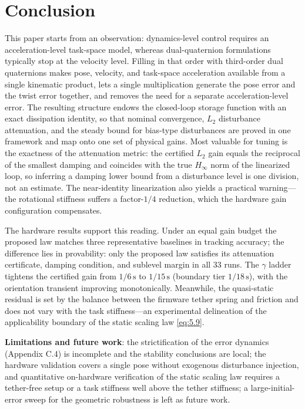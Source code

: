 \section{Conclusion}

This paper starts from an observation: dynamics-level control requires an acceleration-level task-space model, whereas dual-quaternion formulations typically stop at the velocity level. Filling in that order with third-order dual quaternions makes pose, velocity, and task-space acceleration available from a single kinematic product, lets a single multiplication generate the pose error and the twist error together, and removes the need for a separate acceleration-level error. The resulting structure endows the closed-loop storage function with an exact dissipation identity, so that nominal convergence, $L_2$ disturbance attenuation, and the steady bound for bias-type disturbances are proved in one framework and map onto one set of physical gains. Most valuable for tuning is the exactness of the attenuation metric: the certified $L_2$ gain equals the reciprocal of the smallest damping and coincides with the true $H_\infty$ norm of the linearized loop, so inferring a damping lower bound from a disturbance level is one division, not an estimate. The near-identity linearization also yields a practical warning---the rotational stiffness suffers a factor-$1/4$ reduction, which the hardware gain configuration compensates.

The hardware results support this reading. Under an equal gain budget the proposed law matches three representative baselines in tracking accuracy; the difference lies in provability: only the proposed law satisfies its attenuation certificate, damping condition, and sublevel margin in all 33 runs. The $\gamma$ ladder tightens the certified gain from $1/6\,\mathrm{s}$ to $1/15\,\mathrm{s}$ (boundary tier $1/18\,\mathrm{s}$), with the orientation transient improving monotonically. Meanwhile, the quasi-static residual is set by the balance between the firmware tether spring and friction and does not vary with the task stiffness---an experimental delineation of the applicability boundary of the static scaling law \eqref{eq:5.9}.

\textbf{Limitations and future work}: the strictification of the error dynamics (Appendix C.4) is incomplete and the stability conclusions are local; the hardware validation covers a single pose without exogenous disturbance injection, and quantitative on-hardware verification of the static scaling law requires a tether-free setup or a task stiffness well above the tether stiffness; a large-initial-error sweep for the geometric robustness is left as future work.

